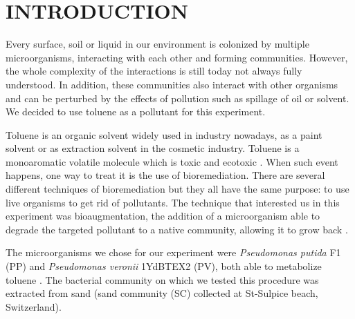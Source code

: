 \documentclass[a4paper, 10pt, conference]{ieeeconf}   %
\begin{document}
\begin{abstract}

\end{abstract}


\section{INTRODUCTION}


Every surface, soil or liquid in our environment is colonized by multiple microorganisms, interacting with each other and forming communities. However, the whole complexity of the interactions is still today not always fully understood.
In addition, these communities also interact with other organisms and can be perturbed by the effects of pollution such as spillage of oil or solvent. We decided to use toluene as a pollutant for this experiment.

Toluene is an organic solvent widely used in industry nowadays, as a paint solvent or as extraction solvent in the cosmetic industry. Toluene is a monoaromatic volatile molecule which is toxic and ecotoxic \cite{toluene}. 
When such event happens, one way to treat it is the use of bioremediation. There are several different techniques of bioremediation but they all have the same purpose: to use live organisms to get rid of pollutants. The technique that interested us in this experiment was bioaugmentation, the addition of a microorganism able to degrade the targeted pollutant to a native community, allowing it to grow back \cite{Bioremediation}.

The microorganisms we chose for our experiment were \textit{Pseudomonas putida} F1 (PP) and \textit{Pseudomonas veronii} 1YdBTEX2 (PV), both able to metabolize toluene \cite{pseudomonas_putida} \cite{Pseudomonas_Veronii}. The bacterial community on which we tested this procedure was extracted from sand (sand community (SC) collected at St-Sulpice beach, Switzerland).
\end{document}

